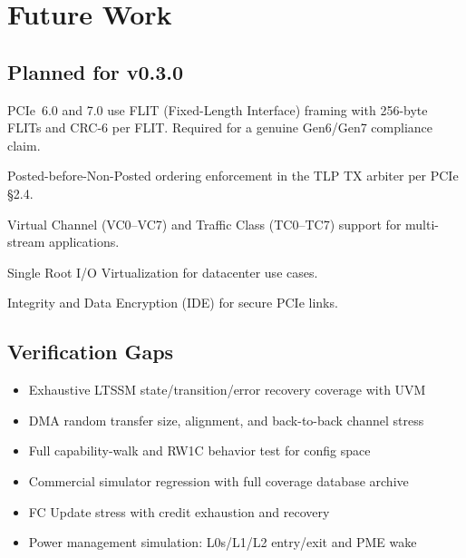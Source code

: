 \documentclass[12pt,a4paper]{report}
\begin{document}
\chapter{Future Work}\label{ch:future}

\section{Planned for v0.3.0}

\begin{description}[leftmargin=3.5cm,style=nextline]
  \item[FLIT mode] PCIe~6.0 and 7.0 use FLIT (Fixed-Length Interface)
    framing with 256-byte FLITs and CRC-6 per FLIT. Required for
    a genuine Gen6/Gen7 compliance claim.
  \item[Ordering rules] Posted-before-Non-Posted ordering enforcement
    in the TLP TX arbiter per PCIe \S2.4.
  \item[VC/TC mapping] Virtual Channel (VC0--VC7) and Traffic Class (TC0--TC7)
    support for multi-stream applications.
  \item[SR-IOV] Single Root I/O Virtualization for datacenter use cases.
  \item[IDE] Integrity and Data Encryption (IDE) for secure PCIe links.
\end{description}

\section{Verification Gaps}

\begin{itemize}[noitemsep]
  \item Exhaustive LTSSM state/transition/error recovery coverage with UVM
  \item DMA random transfer size, alignment, and back-to-back channel stress
  \item Full capability-walk and RW1C behavior test for config space
  \item Commercial simulator regression with full coverage database archive
  \item FC Update stress with credit exhaustion and recovery
  \item Power management simulation: L0s/L1/L2 entry/exit and PME wake
\end{itemize}
\end{document}
